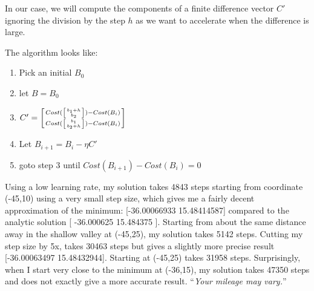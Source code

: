 \begin{fullwidth}
\noindent In our case, we will compute the components of a finite difference vector $C'$ ignoring the division by the step $h$ as we want to accelerate when the difference is large.

The algorithm looks like:

\begin{enumerate}
\item Pick an initial $B_0$
\item let $B = B_0$
\item $C' = \left[ Cost(\left[ b_1+h \above 0pt{b_2} \right]) - Cost(B_i) \above 0pt Cost(\left[ b_1 \above 0pt{b_2+h} \right]) - Cost(B_i) \right]$
\item Let $B_{i+1} = B_i - \eta C'$
\item goto step 3 until $Cost(B_{i+1})-Cost(B_i)=0$
\end{enumerate}

Using a low learning rate, my solution takes 4843 steps starting from coordinate (-45,10) using a very small step size, which gives me a fairly decent approximation of the minimum: [-36.00066933  15.48414587] compared to the analytic solution [ -36.000625 15.484375 ]. Starting from about the same distance away in the shallow valley at (-45,25), my solution takes 5142 steps. Cutting my step size by 5x, takes 30463 steps but gives a slightly more precise result [-36.00063497  15.48432944]. Starting at (-45,25) takes 31958 steps. Surprisingly, when I start very close to the minimum at (-36,15), my solution takes 47350 steps and does not exactly give a more accurate result. ``{\em Your mileage may vary.}''

\noindent {}


\end{fullwidth}
